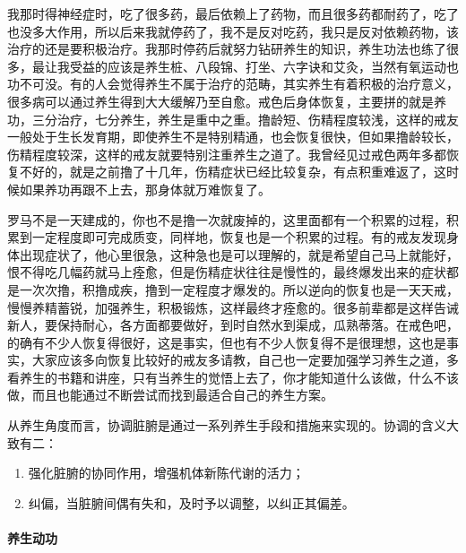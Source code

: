 我那时得神经症时，吃了很多药，最后依赖上了药物，而且很多药都耐药了，吃了也没多大作用，所以后来我就停药了，我不是反对吃药，我只是反对依赖药物，该治疗的还是要积极治疗。我那时停药后就努力钻研养生的知识，养生功法也练了很多，最让我受益的应该是养生桩、八段锦、打坐、六字诀和艾灸，当然有氧运动也功不可没。有的人会觉得养生不属于治疗的范畴，其实养生有着积极的治疗意义，很多病可以通过养生得到大大缓解乃至自愈。戒色后身体恢复，主要拼的就是养功，三分治疗，七分养生，养生是重中之重。撸龄短、伤精程度较浅，这样的戒友一般处于生长发育期，即使养生不是特别精通，也会恢复很快，但如果撸龄较长，伤精程度较深，这样的戒友就要特别注重养生之道了。我曾经见过戒色两年多都恢复不好的，就是之前撸了十几年，伤精症状已经比较复杂，有点积重难返了，这时候如果养功再跟不上去，那身体就万难恢复了。

罗马不是一天建成的，你也不是撸一次就废掉的，这里面都有一个积累的过程，积累到一定程度即可完成质变，同样地，恢复也是一个积累的过程。有的戒友发现身体出现症状了，他心里很急，这种急也是可以理解的，就是希望自己马上就能好，恨不得吃几幅药就马上痊愈，但是伤精症状往往是慢性的，最终爆发出来的症状都是一次次撸，积撸成疾，撸到一定程度才爆发的。所以逆向的恢复也是一天天戒，慢慢养精蓄锐，加强养生，积极锻炼，这样最终才痊愈的。很多前辈都是这样告诫新人，要保持耐心，各方面都要做好，到时自然水到渠成，瓜熟蒂落。在戒色吧，的确有不少人恢复得很好，这是事实，但也有不少人恢复得不是很理想，这也是事实，大家应该多向恢复比较好的戒友多请教，自己也一定要加强学习养生之道，多看养生的书籍和讲座，只有当养生的觉悟上去了，你才能知道什么该做，什么不该做，而且也能通过不断尝试而找到最适合自己的养生方案。

从养生角度而言，协调脏腑是通过一系列养生手段和措施来实现的。协调的含义大致有二：

\begin{enumerate}
    \item 强化脏腑的协同作用，增强机体新陈代谢的活力；
    \item 纠偏，当脏腑间偶有失和，及时予以调整，以纠正其偏差。
\end{enumerate}

\paragraph{养生动功}

